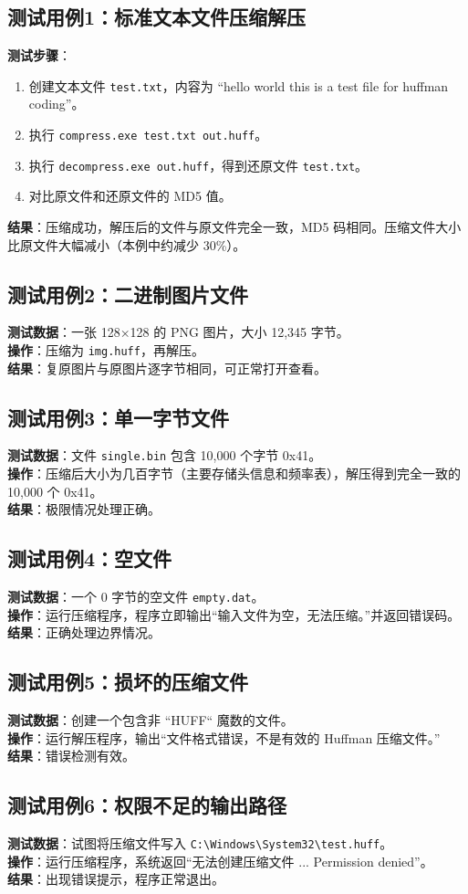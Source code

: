 \documentclass[UTF8]{ctexart}
\begin{document}
\subsection{测试用例1：标准文本文件压缩解压}
\textbf{测试步骤}：
\begin{enumerate}
    \item 创建文本文件 \texttt{test.txt}，内容为 ``hello world this is a test file for huffman coding''。
    \item 执行 \texttt{compress.exe test.txt out.huff}。
    \item 执行 \texttt{decompress.exe out.huff}，得到还原文件 \texttt{test.txt}。
    \item 对比原文件和还原文件的 MD5 值。
\end{enumerate}
\textbf{结果}：压缩成功，解压后的文件与原文件完全一致，MD5 码相同。压缩文件大小比原文件大幅减小（本例中约减少 30\%）。

\subsection{测试用例2：二进制图片文件}
\textbf{测试数据}：一张 128×128 的 PNG 图片，大小 12,345 字节。\\
\textbf{操作}：压缩为 \texttt{img.huff}，再解压。\\
\textbf{结果}：复原图片与原图片逐字节相同，可正常打开查看。

\subsection{测试用例3：单一字节文件}
\textbf{测试数据}：文件 \texttt{single.bin} 包含 10,000 个字节 0x41。\\
\textbf{操作}：压缩后大小为几百字节（主要存储头信息和频率表），解压得到完全一致的 10,000 个 0x41。\\
\textbf{结果}：极限情况处理正确。

\subsection{测试用例4：空文件}
\textbf{测试数据}：一个 0 字节的空文件 \texttt{empty.dat}。\\
\textbf{操作}：运行压缩程序，程序立即输出“输入文件为空，无法压缩。”并返回错误码。\\
\textbf{结果}：正确处理边界情况。

\subsection{测试用例5：损坏的压缩文件}
\textbf{测试数据}：创建一个包含非 ``HUFF`` 魔数的文件。\\
\textbf{操作}：运行解压程序，输出“文件格式错误，不是有效的 Huffman 压缩文件。”\\
\textbf{结果}：错误检测有效。

\subsection{测试用例6：权限不足的输出路径}
\textbf{测试数据}：试图将压缩文件写入 \texttt{C:\textbackslash Windows\textbackslash System32\textbackslash test.huff}。\\
\textbf{操作}：运行压缩程序，系统返回“无法创建压缩文件 ... Permission denied”。\\
\textbf{结果}：出现错误提示，程序正常退出。
\end{document}
